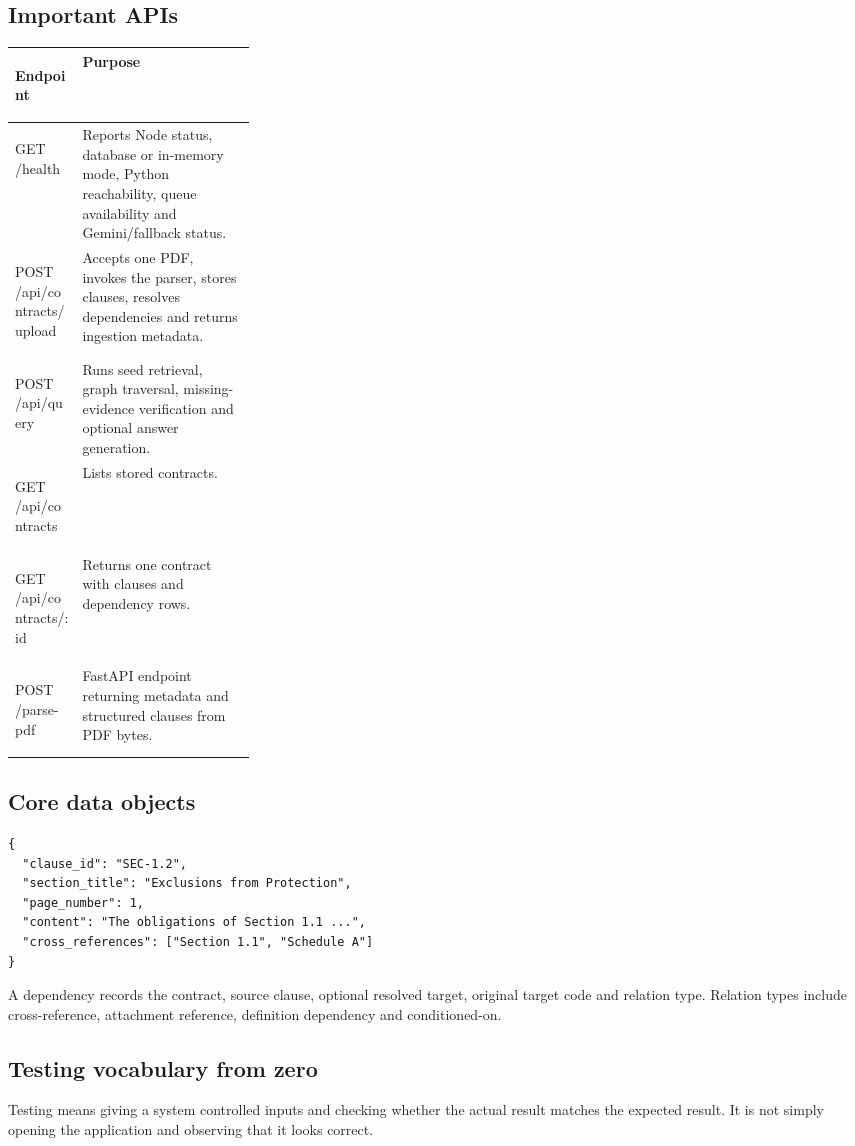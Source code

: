 \documentclass[11pt,letterpaper]{article}
\begin{document}
\newpage
\subsection{Important APIs}
\begin{tabularx}{\linewidth}{>{\bfseries\raggedright\arraybackslash}p{0.28\linewidth}>{\raggedright\arraybackslash}X}
\toprule
Endpoint & Purpose\\
\midrule
GET /health & Reports Node status, database or in-memory mode, Python reachability, queue availability and Gemini/fallback status.\\
POST /api/contracts/upload & Accepts one PDF, invokes the parser, stores clauses, resolves dependencies and returns ingestion metadata.\\
POST /api/query & Runs seed retrieval, graph traversal, missing-evidence verification and optional answer generation.\\
GET /api/contracts & Lists stored contracts.\\
GET /api/contracts/:id & Returns one contract with clauses and dependency rows.\\
POST /parse-pdf & FastAPI endpoint returning metadata and structured clauses from PDF bytes.\\
\bottomrule
\end{tabularx}

\subsection{Core data objects}
\begin{lstlisting}
{
  "clause_id": "SEC-1.2",
  "section_title": "Exclusions from Protection",
  "page_number": 1,
  "content": "The obligations of Section 1.1 ...",
  "cross_references": ["Section 1.1", "Schedule A"]
}
\end{lstlisting}
A dependency records the contract, source clause, optional resolved target, original target code and relation type. Relation types include cross-reference, attachment reference, definition dependency and conditioned-on.

\newpage
\subsection{Testing vocabulary from zero}
Testing means giving a system controlled inputs and checking whether the actual result matches the expected result. It is not simply opening the application and observing that it looks correct.
\end{document}
